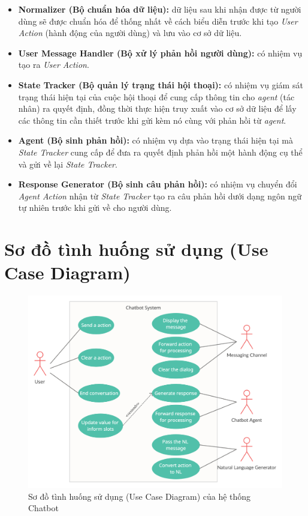 \begin{itemize}
    \item \textbf{Normalizer (Bộ chuẩn hóa dữ liệu):} dữ liệu
    sau khi nhận được từ người dùng sẽ được chuẩn hóa để thống nhất
    về cách biểu diễn trước khi tạo \textit{User Action} (hành động
    của người dùng) và lưu vào cơ sở dữ liệu.
    \item \textbf{User Message Handler (Bộ xử lý phản hồi
    người dùng):} có nhiệm vụ tạo ra \textit{User Action}.
    \item \textbf{State Tracker (Bộ quản lý trạng thái hội thoại):}
    có nhiệm vụ giám sát trạng thái hiện tại của cuộc hội thoại để
    cung cấp thông tin cho \textit{agent} (tác nhân) ra quyết định,
    đồng thời thực hiện truy xuất vào cơ sở dữ liệu để lấy các
    thông tin cần thiết trước khi gửi kèm nó cùng với phản hồi
    từ \textit{agent}.
    \item \textbf{Agent (Bộ sinh phản hồi):} có nhiệm vụ dựa vào
    trạng thái hiện tại mà \textit{State Tracker} cung cấp để đưa ra
    quyết định phản hồi một hành động cụ thể và gửi về lại
    \textit{State Tracker}.
    \item \textbf{Response Generator (Bộ sinh câu phản hồi):} có
    nhiệm vụ chuyển đổi \textit{Agent Action} nhận từ
    \textit{State Tracker} tạo ra câu phản hồi dưới dạng ngôn ngữ
    tự nhiên trước khi gửi về cho người dùng.
\end{itemize}

\section{Sơ đồ tình huống sử dụng (Use Case Diagram)}

\begin{figure}[ht!]
    \centering
    \includegraphics[scale=0.25]{thesis/chatbot/phuongphap/img/use_case.png}
    \caption{Sơ đồ tình huống sử dụng (Use Case Diagram) của hệ thống
    Chatbot}
    \label{fig:usecase}
\end{figure}

